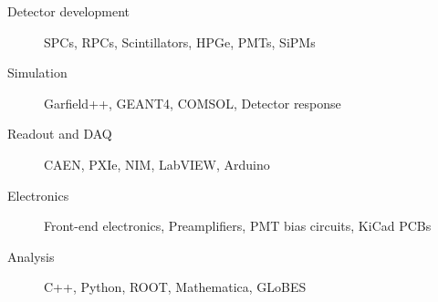 \begin{description}
\item[Detector development] SPCs, RPCs, Scintillators, HPGe, PMTs, SiPMs
\item[Simulation] Garfield++, GEANT4, COMSOL, Detector response
\item[Readout and DAQ] CAEN, PXIe, NIM, LabVIEW, Arduino
\item[Electronics] Front-end electronics, Preamplifiers, PMT bias circuits, KiCad PCBs
\item[Analysis] C++, Python, ROOT, Mathematica, GLoBES
\end{description}
